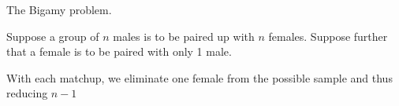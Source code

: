 


The Bigamy problem.

Suppose a group of $n$ males is to be paired up with $n$ females. Suppose further that a female is to be paired with only 1 male.

With each matchup, we eliminate one female from the possible sample and thus reducing $n-1$
